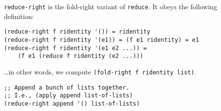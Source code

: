 \begin{entry}{%
  }

  \texttt{reduce-right} is the fold-right variant of
  \texttt{reduce}. It obeys the following definition:

\begin{verbatim}
(reduce-right f ridentity '()) = ridentity
(reduce-right f ridentity '(e1)) = (f e1 ridentity) = e1
(reduce-right f ridentity '(e1 e2 ...)) =
    (f e1 (reduce f ridentity (e2 ...)))
\end{verbatim}

  \ldots{}in other words, we compute \texttt{(fold-right\ f\
    ridentity\ list)}.

\begin{verbatim}
;; Append a bunch of lists together.
;; I.e., (apply append list-of-lists)
(reduce-right append '() list-of-lists)
\end{verbatim}
\end{entry}

